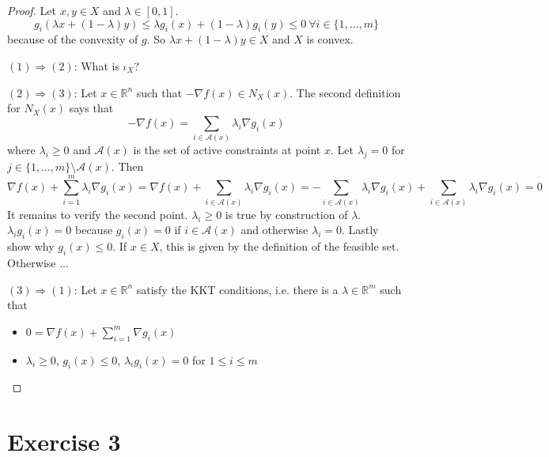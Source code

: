 \documentclass[10pt,a4paper]{article}
\begin{document}
\begin{proof}
  Let $x, y \in X$ and $\lambda \in [0, 1]$.
  \begin{equation*}
    g_{i}(\lambda x + (1 - \lambda)y) \le \lambda g_{i}(x) + (1 - \lambda)g_{i}(y) \le 0~\forall i \in \{ 1, \dots, m \}
  \end{equation*}
  because of the convexity of $g$.
  So $\lambda x + (1 - \lambda)y \in X$ and $X$ is convex.

  $(1) \Rightarrow (2)$: What is $\iota_{X}$?

  $(2) \Rightarrow (3)$: Let $x \in \mathbb{R}^{n}$ such that $-\nabla f(x) \in N_{X}(x)$.
  The second definition for $N_{X}(x)$ says that
  \begin{equation*}
    -\nabla f(x) = \sum_{i \in \mathcal{A}(x)} \lambda_{i} \nabla g_{i}(x)
  \end{equation*}
  where $\lambda_{i} \ge 0$ and $\mathcal{A}(x)$ is the set of active constraints at point $x$.
  Let $\lambda_{j} = 0$ for $j \in \{ 1, \dots, m \} \setminus \mathcal{A}(x)$.
  Then
  \begin{equation*}
    \nabla f(x) + \sum_{i = 1}^{m} \lambda_{i} \nabla g_{i}(x) = \nabla f(x) + \sum_{i \in \mathcal{A}(x)} \lambda_{i} \nabla g_{i}(x) = -\sum_{i \in \mathcal{A}(x)} \lambda_{i} \nabla g_{i}(x) + \sum_{i \in \mathcal{A}(x)} \lambda_{i} \nabla g_{i}(x) = 0
  \end{equation*}
  It remains to verify the second point.
  $\lambda_{i} \ge 0$ is true by construction of $\lambda$.
  $\lambda_{i} g_{i}(x) = 0$ because $g_{i}(x) = 0$ if $i \in \mathcal{A}(x)$ and otherwise $\lambda_{i} = 0$.
  Lastly show why $g_{i}(x) \le 0$.
  If $x \in X$, this is given by the definition of the feasible set.
  Otherwise ...

  $(3) \Rightarrow (1)$: Let $x \in \mathbb{R}^{n}$ satisfy the KKT conditions, i.e. there is a $\lambda \in \mathbb{R}^{m}$ such that
  \begin{itemize}
  \item $0 = \nabla f(x) + \sum_{i = 1}^{m} \nabla g_{i}(x)$
  \item $\lambda_{i} \ge 0$, $g_{i}(x) \le 0$, $\lambda_{i} g_{i}(x) = 0$ for $1 \le i \le m$
  \end{itemize}
\end{proof}

\section*{Exercise 3}
\end{document}
